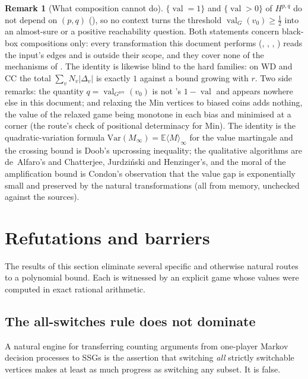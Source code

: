 \documentclass[11pt]{article}
\theoremstyle{plain}
\theoremstyle{definition}
\newtheorem{remark}[theorem]{Remark}
\DeclareMathOperator{\val}{val}
\begin{document}
\begin{remark}[What composition cannot do]
$\{\val=1\}$ and $\{\val>0\}$ of $H^{p,q}$ do not depend on $(p,q)$
(), so no context turns the threshold
$\val_G(v_0)\ge\tfrac12$ into an almost-sure or a positive reachability
question. Both statements concern black-box compositions only: every
transformation this document performs (,
, , )
reads the input's edges and is outside their scope, and they cover none
of the mechanisms of . The identity is likewise blind to
the hard families: on $\mathrm{WD}$ and $\mathrm{CC}$ the total
$\sum_vN_v|\Delta_v|$ is exactly $1$ against a bound growing with $r$.
Two side remarks: the quantity $q=\val_{G^{\mathrm{rev}}}(v_0)$ is not
's $1-\val$ and appears nowhere else in this document;
and relaxing the Min vertices to biased coins adds nothing, the value of
the relaxed game being monotone in each bias and minimised at a corner
(the route's check of positional determinacy for Min). The identity is the
quadratic-variation formula $\mathrm{Var}(M_\infty)=\mathbb E\langle
M\rangle_\infty$ for the value martingale and the crossing bound is
Doob's upcrossing inequality; the qualitative algorithms are de~Alfaro's
and Chatterjee, Jurdzi\'nski and Henzinger's, and the moral of the
amplification bound is Condon's observation that the value gap is
exponentially small and preserved by the natural transformations (all
from memory, unchecked against the sources).
\end{remark}

\section{Refutations and barriers}\label{sec:refutations}

The results of this section eliminate several specific and otherwise
natural routes to a polynomial bound. Each is witnessed by an explicit
game whose values were computed in exact rational arithmetic.

\subsection{The all-switches rule does not dominate}

A natural engine for transferring counting arguments from
one-player Markov decision processes to SSGs is the assertion that
switching \emph{all} strictly switchable vertices makes at least as much
progress as switching any subset. It is false.
\end{document}
